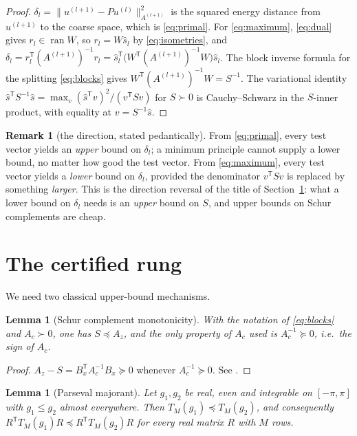 \documentclass[11pt,a4paper]{article}
\theoremstyle{plain}
\newtheorem{lemma}[theorem]{Lemma}
\theoremstyle{definition}
\newtheorem{remark}[theorem]{Remark}
\newcommand{\T}{\mathsf{T}}
\newcommand{\Tm}[1]{T_{#1}}
\newcommand{\ran}{\operatorname{ran}}
\newcommand{\shat}{\widehat{s}}
\newcommand{\PSD}{\succeq 0}
\newcommand{\PD}{\succ 0}
\begin{document}
\begin{proof}
$\delta_{l}=\|u^{(l+1)}-Pu^{(l)}\|^{2}_{A^{(l+1)}}$ is the squared energy distance
from $u^{(l+1)}$ to the coarse space, which is \eqref{eq:primal}. For
\eqref{eq:maximum}, \eqref{eq:dual} gives $r_{l}\in\ran W$, so $r_{l}=W\shat_{l}$ by
\eqref{eq:isometries}, and
$\delta_{l}=r_{l}^{\T}(A^{(l+1)})^{-1}r_{l}
=\shat_{l}^{\T}\bigl(W^{\T}(A^{(l+1)})^{-1}W\bigr)\shat_{l}$.
The block inverse formula for the splitting \eqref{eq:blocks} gives
$W^{\T}(A^{(l+1)})^{-1}W=S^{-1}$. The variational identity
$\shat^{\T}S^{-1}\shat=\max_{v}(\shat^{\T}v)^{2}/(v^{\T}Sv)$ for $S\PD$ is
Cauchy--Schwarz in the $S$-inner product, with equality at $v=S^{-1}\shat$.
\end{proof}

\begin{remark}[the direction, stated pedantically]
\label{rem:direction}
From \eqref{eq:primal}, every test vector yields an \emph{upper} bound on
$\delta_{l}$; a minimum principle cannot supply a lower bound, no matter how good the
test vector. From \eqref{eq:maximum}, every test vector yields a \emph{lower} bound
on $\delta_{l}$, provided the denominator $v^{\T}Sv$ is replaced by something
\emph{larger}. This is the direction reversal of the title of
Section~\ref{sec:main}: what a lower bound on $\delta_{l}$ needs is an
\emph{upper} bound on $S$, and upper bounds on Schur complements are cheap.
\end{remark}

\section{The certified rung}
\label{sec:main}

We need two classical upper-bound mechanisms.

\begin{lemma}[Schur complement monotonicity]
\label{lem:haynsworth}
With the notation of \eqref{eq:blocks} and $A_{c}\PD$, one has $S\preceq A_{z}$, and
the only property of $A_{c}$ used is $A_{c}^{-1}\PSD$, i.e.\ the \emph{sign} of
$A_{c}$.
\end{lemma}

\begin{proof}
$A_{z}-S=B_{x}^{\T}A_{c}^{-1}B_{x}\PSD$ whenever $A_{c}^{-1}\PSD$. See
\cite{Haynsworth1968}.
\end{proof}

\begin{lemma}[Parseval majorant]
\label{lem:parseval}
Let $g_{1},g_{2}$ be real, even and integrable on $[-\pi,\pi]$ with
$g_{1}\le g_{2}$ almost everywhere. Then $\Tm{M}(g_{1})\preceq \Tm{M}(g_{2})$, and
consequently $R^{\T}\Tm{M}(g_{1})R\preceq R^{\T}\Tm{M}(g_{2})R$ for every real
matrix $R$ with $M$ rows.
\end{lemma}
\end{document}
